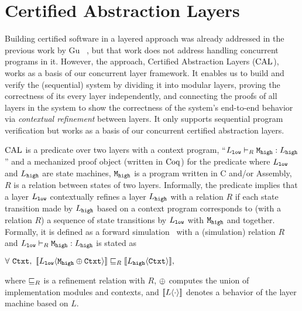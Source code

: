 \section{Certified Abstraction Layers}
\label{chapter:ccal:sec:cal}


Building certified software in a layered approach was already addressed in the previous work by Gu \etal~\cite{deepspec},
but that work does not address handling concurrent programs in it.
However, the approach, Certified Abstraction Layers ($\mathrm{CAL}$), works as a basis of our concurrent layer framework.
It enables us to build and verify the (sequential) system by dividing it into modular layers, 
proving the correctness of its every layer independently, and connecting the proofs of all layers in the system to show the correctness of the system's end-to-end behavior via \textit{contextual refinement} between layers. 
It only supports sequential program verification but works as a basis of our concurrent certified abstraction layers.

$\mathrm{CAL}$ is a predicate over two layers with a context program, 
``$L_{{\mathrm{\texttt{low}}}} \vdash_{R} {\mathrm{\texttt{M}}}_{\mathrm{\texttt{high}}} : L_{{\mathrm{\texttt{high}}}}$'' 
and a mechanized proof object (written in $\mathrm{Coq}$) for the predicate where $L_{{\mathrm{\texttt{low}}}}$ and $L_{{\mathrm{\texttt{high}}}}$ are state machines, ${\mathrm{\texttt{M}}}_{\mathrm{\texttt{high}}}$ is a program written in C and/or Assembly, $R$ is a relation between states of two layers.
Informally, the predicate implies that 
a layer $L_{{\mathrm{\texttt{low}}}}$ contextually refines  a layer $L_{{\mathrm{\texttt{high}}}}$ with a relation $R$
 if each state transition made by $L_{{\mathrm{\texttt{high}}}}$ based on a context program  
 corresponds to (with a relation $R$)  a sequence of 
 state transitions by $L_{{\mathrm{\texttt{low}}}}$ with ${\mathrm{\texttt{M}}}_{{\mathrm{\texttt{high}}}}$ and   together.
 Formally, it is defined as a forward simulation~\cite{Lynch95,leroy09,Milner71,Park81} with a (simulation) relation $R$
 and  $L_{{\mathrm{\texttt{low}}}} \vdash_{R} {\mathrm{\texttt{M}}}_{{\mathrm{\texttt{high}}}}  : L_{{\mathrm{\texttt{high}}}}$ is stated as
 \begin{center}
$\forall\ \codeinmath{Ctxt},\ \sem{L_{\codeinmath{low}}}{\modulecompose{\codeinmath{M}_{\codeinmath{high}}}{\codeinmath{Ctxt}}} \refines_{R} \sem{L_{\codeinmath{high}}}{\codeinmath{Ctxt}},$
\end{center}
where $\sqsubseteq_{R}$ is a refinement relation with $R$, 
$\oplus$ computes the union 
 of implementation modules and contexts,
and $[\![{L} \langle {\cdot} \rangle]\!]$ denotes a  behavior of the layer machine based on $L$.


